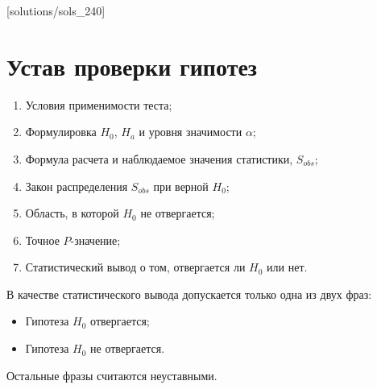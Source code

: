 [solutions/sols_240]

\chapter{Устав проверки гипотез}

\begin{enumerate}
\item Условия применимости теста;
\item Формулировка $H_0$, $H_a$ и уровня значимости $\alpha$;
\item Формула расчета и наблюдаемое значения статистики, $S_{obs}$;
\item Закон распределения $S_{obs}$ при верной $H_0$;
\item Область, в которой $H_0$ не отвергается;
\item Точное $P$-значение;
\item Статистический вывод о том, отвергается ли $H_0$ или нет.
\end{enumerate}


В качестве статистического вывода допускается только одна из двух фраз:
\begin{itemize}
\item Гипотеза $H_0$ отвергается;
\item Гипотеза $H_0$ не отвергается.
\end{itemize}

Остальные фразы считаются неуставными.

